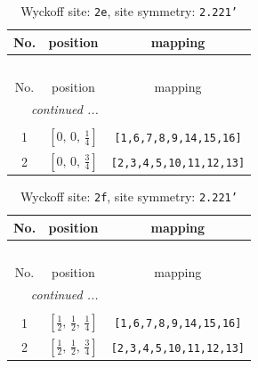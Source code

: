 \documentclass[fleqn,8pt]{jsarticle}
\begin{document}
\begin{longtable}{ccc}
\caption{Wyckoff site: {\tt 2e}, site symmetry: {\tt 2.221'}}
 \\
 \hline \hline
No. & position & mapping \\ \hline \endfirsthead

\multicolumn{2}{l}{\tablename\ \thetable{}} \\
 \hline \hline
No. & position & mapping \\ \hline \endhead

 \hline \hline
\multicolumn{2}{r}{\footnotesize\it continued ...} \\ \endfoot

 \hline \hline
\multicolumn{2}{r}{} \\ \endlastfoot

1 & $\left[ 0,\, 0,\, \frac{1}{4} \right]$ & {\tt [1,6,7,8,9,14,15,16]} \\ \hline
2 & $\left[ 0,\, 0,\, \frac{3}{4} \right]$ & {\tt [2,3,4,5,10,11,12,13]} \\
\end{longtable}
\renewcommand{\arraystretch}{1.2}
\begin{longtable}{ccc}
\caption{Wyckoff site: {\tt 2f}, site symmetry: {\tt 2.221'}}
 \\
 \hline \hline
No. & position & mapping \\ \hline \endfirsthead

\multicolumn{2}{l}{\tablename\ \thetable{}} \\
 \hline \hline
No. & position & mapping \\ \hline \endhead

 \hline \hline
\multicolumn{2}{r}{\footnotesize\it continued ...} \\ \endfoot

 \hline \hline
\multicolumn{2}{r}{} \\ \endlastfoot

1 & $\left[ \frac{1}{2},\, \frac{1}{2},\, \frac{1}{4} \right]$ & {\tt [1,6,7,8,9,14,15,16]} \\ \hline
2 & $\left[ \frac{1}{2},\, \frac{1}{2},\, \frac{3}{4} \right]$ & {\tt [2,3,4,5,10,11,12,13]} \\
\end{longtable}
\renewcommand{\arraystretch}{1.2}
\end{document}

